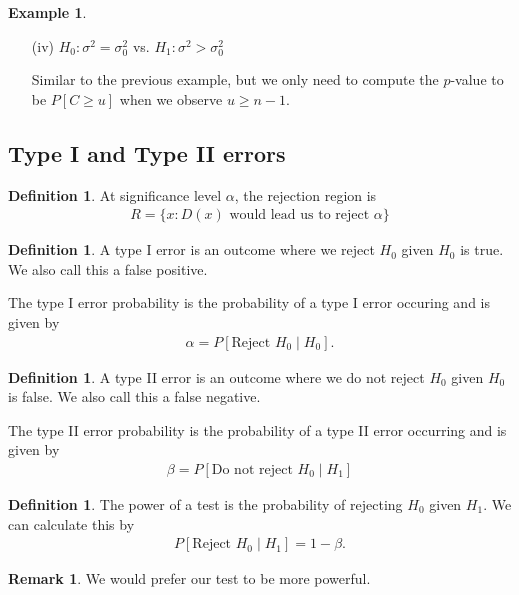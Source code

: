 \documentclass[11pt]{amsart}
\theoremstyle{definition}
\newtheorem{definition}[theorem]{Definition}
\newtheorem{remark}[theorem]{Remark}
\newtheorem{example}[theorem]{Example}
\numberwithin{equation}{section}
\begin{document}
\begin{example}
\begin{enumerate}
        Note that this is not actually quite right. For example, if we had $d\ge n-1$, we would be accounting for the entire left half of the distribution (from $0$ to $n-1$). We thus need to perform some rescaling on the statistic to make this work. However, we can make a good approximation for the $p$-value as follows:

        If our observed value $u$ for $U=\frac{(n-1)S^2}{\sigma_0^2}$ is below $n-1$, then compute $2P[C\le u]$. If it is above, then compute $2P[C\ge u]$. 
        \item [(iv)] $H_0:\sigma^2=\sigma_0^2$ vs. $H_1:\sigma^2>\sigma_0^2$

        Similar to the previous example, but we only need to compute the $p$-value to be $P[C\ge u]$ when we observe $u\ge n-1$.
    \end{enumerate}
\end{example}
\subsection{Type I and Type II errors}
\begin{definition}
    At significance level $\alpha$, the rejection region is 
    \begin{align*}
        R=\{x:D(x)\text{ would lead us to reject }\alpha\}
    \end{align*}
\end{definition}
\begin{definition}
    A type I error is an outcome where we reject $H_0$ given $H_0$ is true. We also call this a false positive.

    The type I error probability is the probability of a type I error occuring and is given by
    \begin{align*}
        \alpha=P[\text{Reject } H_0\mid H_0].
    \end{align*}
\end{definition}
\begin{definition}
    A type II error is an outcome where we do not reject $H_0$ given $H_0$ is false. We also call this a false negative.

    The type II error probability is the probability of a type II error occurring and is given by
    \begin{align*}
        \beta=P[\text{Do not reject }H_0\mid H_1]
    \end{align*}
\end{definition}
\begin{definition}
    The power of a test is the probability of rejecting $H_0$ given $H_1$. We can calculate this by 
    \begin{align*}
        P[\text{Reject }H_0\mid H_1]=1-\beta.
    \end{align*}
\end{definition}
\begin{remark}
    We would prefer our test to be more powerful.
\end{remark}
\end{document}

